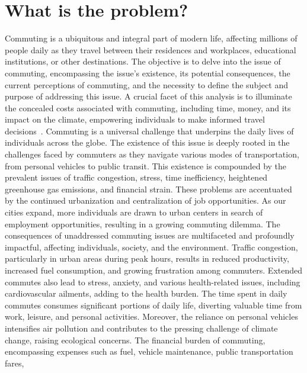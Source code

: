 \section{What is the problem?}\label{sec:what-is-the-problem?}

Commuting is a ubiquitous and integral part of modern life, affecting millions of people daily as they travel between
their residences and workplaces, educational institutions, or other destinations.
The objective is to delve into the issue of commuting, encompassing the issue's existence, its potential consequences,
the current perceptions of commuting, and the necessity to define the subject and purpose of addressing this issue.
A crucial facet of this analysis is to illuminate the concealed costs associated with commuting, including time, money,
and its impact on the climate, empowering individuals to make informed travel decisions~\cite{alma9921355859805762}.
Commuting is a universal challenge that underpins the daily lives of individuals across the globe.
The existence of this issue is deeply rooted in the challenges faced by commuters as they navigate various modes of
transportation, from personal vehicles to public transit.
This existence is compounded by the prevalent issues of traffic congestion, stress, time inefficiency, heightened
greenhouse gas emissions, and financial strain.
These problems are accentuated by the continued urbanization and centralization of job opportunities.
As our cities expand, more individuals are drawn to urban centers in search of employment opportunities, resulting in a
growing commuting dilemma.
The consequences of unaddressed commuting issues are multifaceted and profoundly impactful, affecting individuals,
society, and the environment.
Traffic congestion, particularly in urban areas during peak hours, results in reduced productivity, increased fuel
consumption, and growing frustration among commuters.
Extended commutes also lead to stress, anxiety, and various health-related issues, including cardiovascular ailments,
adding to the health burden.
The time spent in daily commutes consumes significant portions of daily life, diverting valuable time from work,
leisure, and personal activities.
Moreover, the reliance on personal vehicles intensifies air pollution and contributes to the pressing challenge of
climate change, raising ecological concerns.
The financial burden of commuting, encompassing expenses such as fuel, vehicle maintenance, public transportation fares,
